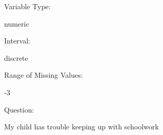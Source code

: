 \documentclass[
]{article}
\begin{document}
\begin{minipage}[t]{0.3\linewidth}

Variable Type:

\end{minipage}%
\begin{minipage}[t]{0.7\linewidth}

numeric

\end{minipage}

\begin{minipage}[t]{0.3\linewidth}

Interval:

\end{minipage}%
\begin{minipage}[t]{0.7\linewidth}

discrete

\end{minipage}

\begin{minipage}[t]{0.3\linewidth}

Range of Missing Values:

\end{minipage}%
\begin{minipage}[t]{0.7\linewidth}

-3

\end{minipage}

\begin{minipage}[t]{0.3\linewidth}

Question:

\end{minipage}%
\begin{minipage}[t]{0.7\linewidth}

My child has trouble keeping up with schoolwork

\end{minipage}
\end{document}
